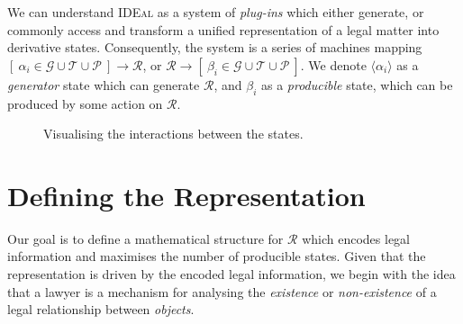 \documentclass{article}
\newcounter{pic}[page]
\newcounter{fig}[page]
\numberwithin{equation}{section}
\newcommand{\ideal}{\textsc{IDEal }}
\newcommand{\braket}[1]{\langle #1 \rangle}
\begin{document}
We can understand \ideal as a system of \textit{plug-ins} which either generate, or commonly access and transform a unified representation of a legal matter into derivative states. Consequently, the system is a series of machines mapping $[ \ \alpha_i \in \mathcal{G \cup T \cup P} \ ] \rightarrow \mathcal{R}$, or $\mathcal{R} \rightarrow [ \ \beta_i \in \mathcal{G \cup T \cup P} \ ]$. We denote $\braket{\alpha_i}$ as a \textit{generator} state which can generate $\mathcal{R}$, and $\beta_i$ as a \textit{producible} state, which can be produced by some action on $\mathcal{R}$.
\begin{figure}[h]
\begin{center}
\end{center}
\caption{Visualising the interactions between the states.}
\end{figure}


\section{Defining the Representation}

Our goal is to define a mathematical structure for $\mathcal{R}$ which encodes legal information and maximises the number of producible states. Given that the representation is driven by the encoded legal information, we begin with the idea that a lawyer is a mechanism for analysing the \textit{existence} or \textit{non-existence} of a legal relationship between \textit{objects}. 

\end{document}
